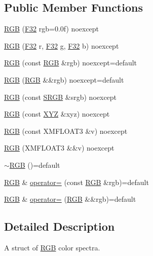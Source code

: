 \subsection*{Public Member Functions}
\begin{DoxyCompactItemize}
\item 
\hyperlink{structmage_1_1_r_g_b_a02c4573299da3acc4ff6fc3e3874ef2e}{R\+GB} (\hyperlink{namespacemage_aa97e833b45f06d60a0a9c4fc22ae02c0}{F32} rgb=0.\+0f) noexcept
\item 
\hyperlink{structmage_1_1_r_g_b_ae8bf65bd6df05e7ebfc420311ee7992b}{R\+GB} (\hyperlink{namespacemage_aa97e833b45f06d60a0a9c4fc22ae02c0}{F32} r, \hyperlink{namespacemage_aa97e833b45f06d60a0a9c4fc22ae02c0}{F32} g, \hyperlink{namespacemage_aa97e833b45f06d60a0a9c4fc22ae02c0}{F32} b) noexcept
\item 
\hyperlink{structmage_1_1_r_g_b_a0cbea6a9d7e9f7206b8d67161c58e7f8}{R\+GB} (const \hyperlink{structmage_1_1_r_g_b}{R\+GB} \&rgb) noexcept=default
\item 
\hyperlink{structmage_1_1_r_g_b_a0af0ca50cd942eab0e781dd05817755c}{R\+GB} (\hyperlink{structmage_1_1_r_g_b}{R\+GB} \&\&rgb) noexcept=default
\item 
\hyperlink{structmage_1_1_r_g_b_a2f2c4eea3b0c44e0f31cfe20c6371d64}{R\+GB} (const \hyperlink{structmage_1_1_s_r_g_b}{S\+R\+GB} \&srgb) noexcept
\item 
\hyperlink{structmage_1_1_r_g_b_a62a2200960f84f1b6bd4b743510201a4}{R\+GB} (const \hyperlink{structmage_1_1_x_y_z}{X\+YZ} \&xyz) noexcept
\item 
\hyperlink{structmage_1_1_r_g_b_ae4cc4b9823cfad9f064dd236df92a085}{R\+GB} (const X\+M\+F\+L\+O\+A\+T3 \&v) noexcept
\item 
\hyperlink{structmage_1_1_r_g_b_acb00a83044f3d74247b95c198e364e4e}{R\+GB} (X\+M\+F\+L\+O\+A\+T3 \&\&v) noexcept
\item 
\hyperlink{structmage_1_1_r_g_b_a2c01428e1da4ec354b85320a905beab3}{$\sim$\+R\+GB} ()=default
\item 
\hyperlink{structmage_1_1_r_g_b}{R\+GB} \& \hyperlink{structmage_1_1_r_g_b_a904c9c27986975b015abcd9c0d4e137f}{operator=} (const \hyperlink{structmage_1_1_r_g_b}{R\+GB} \&rgb)=default
\item 
\hyperlink{structmage_1_1_r_g_b}{R\+GB} \& \hyperlink{structmage_1_1_r_g_b_a6a170116718ca911ef2aa8dd9a397389}{operator=} (\hyperlink{structmage_1_1_r_g_b}{R\+GB} \&\&rgb)=default
\end{DoxyCompactItemize}


\subsection{Detailed Description}
A struct of \hyperlink{structmage_1_1_r_g_b}{R\+GB} color spectra. 

